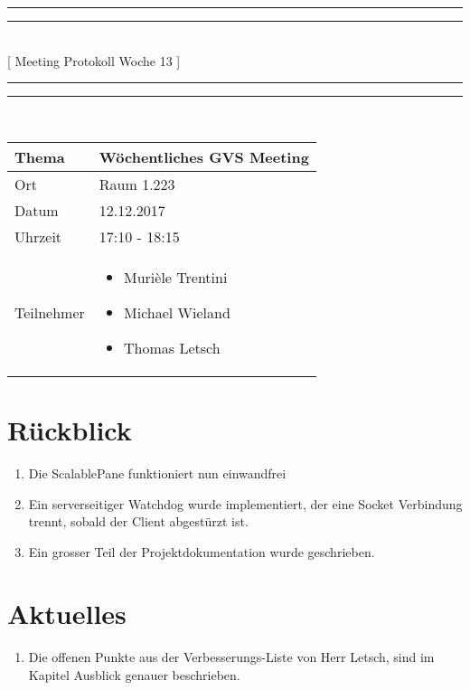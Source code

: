 \documentclass[11pt, a4paper,oneside]{scrartcl}
\begin{document}
	\centering
	\rule{\textwidth}{1.6pt}\vspace*{-\baselineskip}\vspace*{2pt} %
	\rule{\textwidth}{0.4pt}\\[\baselineskip] %
	{\LARGE [ Meeting Protokoll Woche 13 ]}\\[0.2\baselineskip] %
	\rule{\textwidth}{0.4pt}\vspace*{-\baselineskip}\vspace{3.2pt} %
	\rule{\textwidth}{1.6pt}\\[2\baselineskip] %
	
	\begin{tabu} to \linewidth {l X }
		\toprule
		\textbf{Thema} & \textbf{Wöchentliches GVS Meeting} \\
		\midrule
		Ort & Raum 1.223 \\
		Datum & 12.12.2017  \\
		Uhrzeit &  17:10 - 18:15  \\
		Teilnehmer & 
		\begin{minipage}[t]{\textwidth}
			\begin{itemize}
				\item Murièle Trentini
				\item Michael Wieland
				\item Thomas Letsch
			\end{itemize}
		\end{minipage}
		\\
		\bottomrule
	\end{tabu}
	
	
	\section{Rückblick}
	\begin{enumerate}
		\item Die ScalablePane funktioniert nun einwandfrei
		\item Ein serverseitiger Watchdog wurde implementiert, der eine Socket Verbindung trennt, sobald der Client abgestürzt ist.
		\item Ein grosser Teil der Projektdokumentation wurde geschrieben.
	\end{enumerate}
	
	\section{Aktuelles}
	\begin{enumerate}
		\item Die offenen Punkte aus der Verbesserungs-Liste von Herr Letsch, sind im Kapitel Ausblick genauer beschrieben.
	\end{enumerate} 
	
\end{document}
